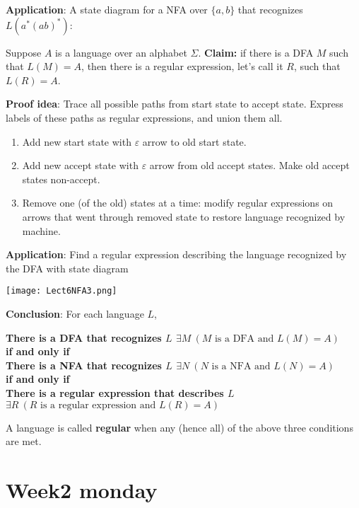 \documentclass[12pt, oneside]{article}
\begin{document}
{\bf Application}: A state diagram for a NFA over $\{a,b\}$ that recognizes $L(a^* (ab)^*)$:

\vfill

\newpage

Suppose $A$ is a language over an alphabet $\Sigma$.
{\bf Claim:} if there is a DFA $M$ such that $L(M) = A$, then there is a regular expression, let's call it $R$, such that 
$L(R) = A$.

{\bf Proof idea}: Trace all possible paths from start state to accept state.  Express labels of these paths
as regular expressions, and union them all.

\begin{enumerate}
\item Add new start state with $\varepsilon$ arrow to old start state.
\item Add new accept state with $\varepsilon$ arrow from old accept states.  Make old accept states
non-accept.
\item Remove one (of the old) states at a time: modify regular expressions on arrows that went through removed
state to restore language recognized by machine.
\end{enumerate}

{\bf Application}: Find a regular expression describing the language recognized by the DFA with 
state diagram

\texttt{[image: Lect6NFA3.png]}

\vfill


\newpage

{\bf Conclusion}: For each language $L$,
\begin{center}
    {\bf There is a DFA that recognizes $L$ \qquad $\exists M ~(M \textrm{ is a DFA and } L(M) = A)$}\\
    {\bf if and only if}\\
    {\bf There is a NFA that recognizes $L$  \qquad $\exists N ~(N \textrm{ is a NFA and } L(N) = A)$}\\
    {\bf if and only if}\\
    {\bf There is a regular expression that describes $L$ $\exists R ~(R \textrm{ is a regular expression and } L(R) = A)$}\\
\end{center}

A language is called {\bf regular} when any (hence all) of the above three conditions are met. \vfill
\section*{Week2 monday}
\end{document}
